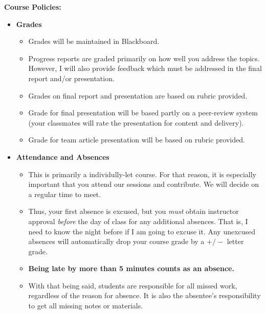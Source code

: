 \documentclass[11pt]{article}\usepackage[]{graphicx}\usepackage[]{color}
\begin{document}
\textbf {\large Course Policies:}
\begin{itemize}
	\item \textbf {Grades}
		\begin{itemize}
			\item Grades will be maintained in Blackboard. 
			\item Progress reports are graded primarily on how well you address the topics. However, I will also provide feedback which must be addressed in the final report and/or presentation.
			\item Grades on final report and presentation are based on rubric provided.
			\item Grade for final presentation will be based partly on a peer-review system (your classmates will rate the presentation for content and delivery).
						\item Grade for team article presentation will be based on rubric provided.
		\end{itemize}

	\item \textbf{Attendance and Absences}
		\begin{itemize}
		  \item This is primarily a individully-let course. For that reason, it is especially important that you attend our sessions and contribute. We will decide on a regular time to meet. 
		  \item Thus, your first absence is excused, but you \textit{must} obtain instructor approval \textit{before} the day of class for any additional absences. That is, I need to know the night before if I am going to excuse it. Any unexcused absences will automatically drop your course grade by a $+/-$ letter grade. 
		  \item \textbf{Being late by more than 5 minutes counts as an absence.}
			\item With that being said, students are responsible for all missed work, regardless of the reason for absence. It is also the absentee's responsibility to get all missing notes or materials.
		\end{itemize}

\end{itemize}
\end{document}
